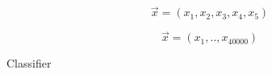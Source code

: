 \documentclass[12pt]{article} %
\begin{document}
\[ \vec{x} = (x_1, x_2, x_3, x_4, x_5) \]

\[ \vec{x} = (x_1, .., x_{40000}) \]

Classifier
\end{document}
